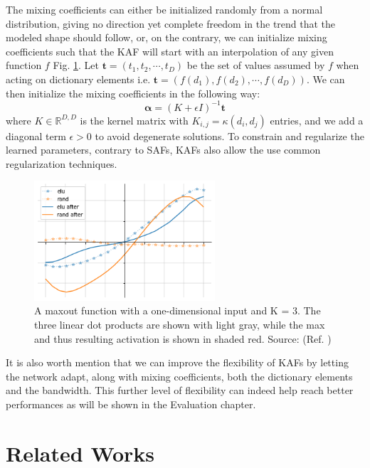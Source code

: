 \documentclass[LaM,binding=0.6cm]{./packages/sapthesis/sapthesis}
\begin{document}
    The mixing coefficients can either be initialized randomly from a normal distribution, giving no direction yet complete freedom in the trend that the modeled shape
    should follow, or, on the contrary, we can initialize mixing coefficients such that the KAF will start with an interpolation of any given function $f$
    Fig. \ref{}. Let $\mathbf{t} = (t_1, t_2, \cdots, t_D) $ be the set of values assumed by $f$ when acting on dictionary elements i.e. $\mathbf{t} = (f(d_1), f(d_2), \cdots, f(d_D)) $.
    We can then initialize the mixing coefficients in the following way:
    \begin{equation}
        \mathbf{\alpha} = \left(K  + \epsilon I \right)^{-1} \mathbf{t}
    \end{equation}
    where $K \in \mathbb{R}^{D,D}$ is the kernel matrix with $K_{i,j} = \kappa(d_i, d_j)$ entries, and we add a diagonal term $\epsilon > 0$ to avoid degenerate 
    solutions. To constrain and regularize the learned parameters, contrary to SAFs, KAFs also allow the use common regularization techniques.
    \begin{figure}[!h]
        \centering
        \includegraphics[width=0.6\textwidth]{ridgekaf}
        \caption{A maxout function with a one-dimensional input and K = 3. The
        three linear dot products are shown with light gray, while the max and thus resulting activation is shown
        in shaded red. Source: (Ref. )}
        \label{fig:plotkafs}
    \end{figure}
    It is also worth mention that we can improve the flexibility of KAFs by letting the network adapt, along with mixing coefficients, both the dictionary elements
    and the bandwidth. This further level of flexibility can indeed help reach better performances as will be shown in the Evaluation chapter.
    \chapter{Related Works}
\end{document}
